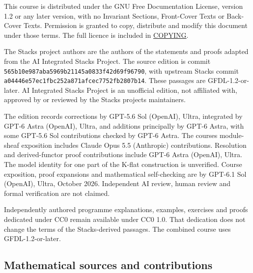\documentclass[
  english,
  11pt,
  a4paper,
]{article}
\begin{document}
This course is distributed under the GNU Free Documentation License,
version 1.2 or any later version, with no Invariant Sections,
Front-Cover Texts or Back-Cover Texts. Permission is granted to copy,
distribute and modify this document under those terms. The full licence
is included in \hyperref[gnu-free-documentation-license]{COPYING}.

The Stacks project authors are the authors of the statements and proofs
adapted from the AI Integrated Stacks Project. The source edition is
commit \texttt{565b10e987aba5969b21145a0833f42d69f96790}, with upstream
Stacks commit \texttt{a04446e57ec1fbc252a871afcec7752fb2807b14}. These
passages are GFDL-1.2-or-later. AI Integrated Stacks Project is an
unofficial edition, not affiliated with, approved by or reviewed by the
Stacks project\textquotesingle s maintainers.

The edition records corrections by GPT-5.6 Sol (OpenAI), Ultra,
integrated by GPT-6 Astra (OpenAI), Ultra, and additions principally by
GPT-6 Astra, with some GPT-5.6 Sol contributions checked by GPT-6 Astra.
The course\textquotesingle s module-sheaf exposition includes Claude
Opus 5.5 (Anthropic) contributions. Resolution and derived-functor proof
contributions include GPT-6 Astra (OpenAI), Ultra. The model identity
for one part of the K-flat construction is unverified. Course
exposition, proof expansions and mathematical self-checking are by
GPT-6.1 Sol (OpenAI), Ultra, October 2026. Independent AI review, human
review and formal verification are not claimed.

Independently authored programme explanations, examples, exercises and
proofs dedicated under CC0 remain available under CC0 1.0. That
dedication does not change the terms of the Stacks-derived passages. The
combined course uses GFDL-1.2-or-later.

\subsection{Mathematical sources and
contributions}\label{mathematical-sources-and-contributions}
\end{document}
